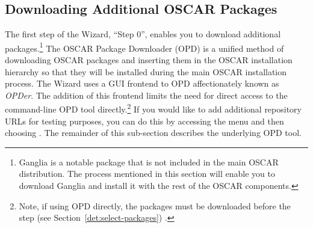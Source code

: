 
\subsection{Downloading Additional OSCAR Packages}
\label{det:opd}

\optional

The first step of the Wizard, ``Step 0'', enables you to download
additional packages.\footnote{Ganglia is a notable
  package that is not included in the main OSCAR distribution.  The
  process mentioned in this section will enable you to download
  Ganglia and install it with the rest of the OSCAR components.}  
The OSCAR Package Downloader (OPD) is a unified method of downloading
OSCAR packages and inserting them in the OSCAR installation hierarchy
so that they will be installed during the main OSCAR installation
process.  The Wizard uses a GUI frontend to OPD affectionately known as
\emph{OPDer}.  The addition of this frontend limits the need for direct
access to the command-line OPD tool directly.\footnote{Note, if using OPD
directly, the packages must be downloaded before the  step (see Section~\ref{det:select-packages}) .}  
\begchange
If you would like to add additional repository URLs for testing
purposes, you can do this by accessing the  menu and then 
choosing . 
The remainder of this sub-section describes the underlying OPD tool.
\endchange


